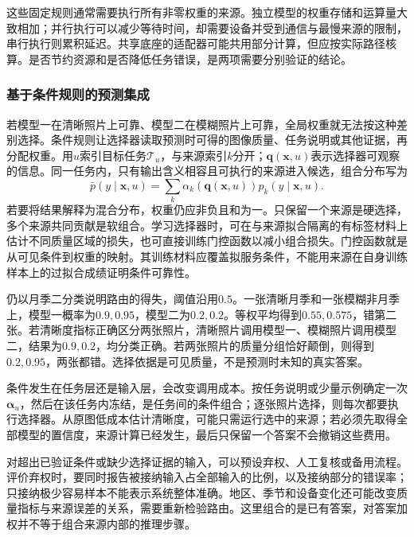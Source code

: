 这些固定规则通常需要执行所有非零权重的来源。独立模型的权重存储和运算量大致相加；并行执行可以减少等待时间，却需要设备并受到通信与最慢来源的限制，串行执行则累积延迟。共享底座的适配器可能共用部分计算，但应按实际路径核算。是否节约资源和是否降低任务错误，是两项需要分别验证的结论。

\subsubsection{基于条件规则的预测集成}
\label{sec:ket-integration-conditional-prediction}

若模型一在清晰照片上可靠、模型二在模糊照片上可靠，全局权重就无法按这种差别选择。条件规则让选择器读取预测时可得的图像质量、任务说明或其他证据，再分配权重。用$u$索引目标任务$\mathcal T_u$，与来源索引$k$分开；$\bm{q}(\bm{x},u)$表示选择器可观察的信息。同一任务内，只有输出含义相容且可执行的来源进入候选，组合分布写为
\begin{equation}
  \bar p(y\mid\bm{x},u)
  =\sum_k\alpha_k(\bm{q}(\bm{x},u))p_k(y\mid\bm{x},u).
  \label{eq:ket-integration-conditional-average}
\end{equation}
若要将结果解释为混合分布，权重仍应非负且和为一。只保留一个来源是硬选择，多个来源共同贡献是软组合。学习选择器时，可在与来源拟合隔离的有标签材料上估计不同质量区域的损失，也可直接训练门控函数以减小组合损失。门控函数就是从可见条件到权重的映射。其训练材料应覆盖拟服务条件，不能用来源在自身训练样本上的过拟合成绩证明条件可靠性。

仍以月季二分类说明路由的得失，阈值沿用$0.5$。一张清晰月季和一张模糊非月季上，模型一概率为$0.9,0.95$，模型二为$0.2,0.2$。等权平均得到$0.55,0.575$，错第二张。若清晰度指标正确区分两张照片，清晰照片调用模型一、模糊照片调用模型二，结果为$0.9,0.2$，均分类正确。若两张照片的质量分组恰好颠倒，则得到$0.2,0.95$，两张都错。选择依据是可见质量，不是预测时未知的真实答案。

条件发生在任务层还是输入层，会改变调用成本。按任务说明或少量示例确定一次$\bm{\alpha}_u$，然后在该任务内冻结，是任务间的条件组合；逐张照片选择，则每次都要执行选择器。从原图低成本估计清晰度，可能只需运行选中的来源；若必须先取得全部模型的置信度，来源计算已经发生，最后只保留一个答案不会撤销这些费用。

对超出已验证条件或缺少选择证据的输入，可以预设弃权、人工复核或备用流程。评价弃权时，要同时报告被接纳输入占全部输入的比例，以及接纳部分的错误率；只接纳极少容易样本不能表示系统整体准确。地区、季节和设备变化还可能改变质量指标与来源误差的关系，需要重新检验路由。这里组合的是已有答案，对答案加权并不等于组合来源内部的推理步骤。

